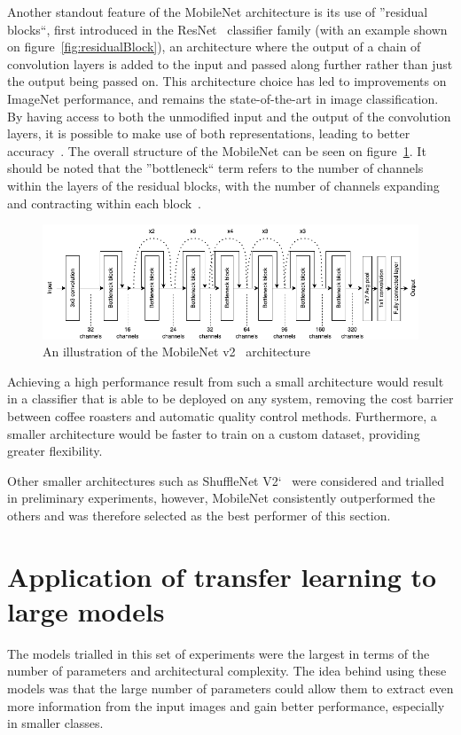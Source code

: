 Another standout feature of the MobileNet architecture is its use of ''residual blocks``, first introduced in the ResNet~\cite{resNet} classifier family (with an example shown on figure~\ref{fig:residualBlock}), an architecture where the output of
a chain of convolution layers is added to the input and passed along further rather than just the output being passed on.
This architecture choice has led to improvements on ImageNet performance, and remains the state-of-the-art in image classification.
By having access to both the unmodified input and the output of the convolution layers, it is possible to make use of both representations,
leading to better accuracy~\cite{resNet}.
The overall structure of the MobileNet can be seen on figure~\ref{fig:mobilenetSketch}.
It should be noted that the ''bottleneck`` term refers to the number of channels within the layers of the residual blocks,
with the number of channels expanding and contracting within each block~\cite{mobileNet}.

\begin{figure}[!ht]
    \centering
    \includegraphics[width=\textwidth]{figures/methodology/mobilenet_diagram}
    \caption[An illustration of the MobileNet v2 architecture]
    {An illustration of the MobileNet v2~\cite{mobileNet} architecture}
    \label{fig:mobilenetSketch}
\end{figure}

Achieving a high performance result from such a small architecture would result in a classifier that is able to be deployed
on any system, removing the cost barrier between coffee roasters and automatic quality control methods.
Furthermore, a smaller architecture would be faster to train on a custom dataset, providing greater flexibility.

Other smaller architectures such as ShuffleNet V2`~\cite{shuffleNet} were considered and trialled in preliminary experiments,
however, MobileNet consistently outperformed the others and was therefore selected as the best performer of this section.
\section{Application of transfer learning to large models}
\label{sec:transfer-learning}
The models trialled in this set of experiments were the largest in terms of the number of parameters and
architectural complexity.
The idea behind using these models was that the large number of parameters could allow them to extract even more information
from the input images and gain better performance, especially in smaller classes.

